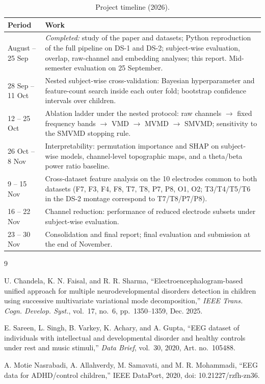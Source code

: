 \documentclass[11pt,a4paper]{article}
\begin{document}
\begin{table}[h]
\centering\footnotesize
\caption{Project timeline (2026).}
\label{tab:plan}
\begin{tabularx}{\textwidth}{l X}
\toprule
Period & Work \\
\midrule
August -- 25 Sep & \emph{Completed:} study of the paper and datasets; Python
       reproduction of the full pipeline on DS-1 and DS-2; subject-wise
       evaluation, overlap, raw-channel and embedding analyses; this report.
       Mid-semester evaluation on 25 September. \\
28 Sep -- 11 Oct & Nested subject-wise cross-validation: Bayesian
       hyperparameter and feature-count search inside each outer fold;
       bootstrap confidence intervals over children. \\
12 -- 25 Oct & Ablation ladder under the nested protocol: raw channels
       $\rightarrow$ fixed frequency bands $\rightarrow$ VMD $\rightarrow$
       MVMD $\rightarrow$ SMVMD; sensitivity to the SMVMD stopping rule. \\
26 Oct -- 8 Nov & Interpretability: permutation importance and SHAP on
       subject-wise models, channel-level topographic maps, and a theta/beta
       power ratio baseline. \\
9 -- 15 Nov & Cross-dataset feature analysis on the 10 electrodes common to
       both datasets (F7, F3, F4, F8, T7, T8, P7, P8, O1, O2; T3/T4/T5/T6 in
       the DS-2 montage correspond to T7/T8/P7/P8). \\
16 -- 22 Nov & Channel reduction: performance of reduced electrode subsets
       under subject-wise evaluation. \\
23 -- 30 Nov & Consolidation and final report; final evaluation and
       submission at the end of November. \\
\bottomrule
\end{tabularx}
\end{table}

\footnotesize
\begin{thebibliography}{9}
\setlength{\itemsep}{0pt}

 U. Chandela, K. N. Faisal, and R. R. Sharma,
``Electroencephalogram-based unified approach for multiple neurodevelopmental
disorders detection in children using successive multivariate variational mode
decomposition,'' \emph{IEEE Trans. Cogn. Develop. Syst.}, vol.~17, no.~6,
pp.~1350--1359, Dec. 2025.

 E. Sareen, L. Singh, B. Varkey, K. Achary, and
A. Gupta, ``EEG dataset of individuals with intellectual and developmental
disorder and healthy controls under rest and music stimuli,'' \emph{Data
Brief}, vol.~30, 2020, Art. no.~105488.

 A. Motie Nasrabadi, A. Allahverdy, M. Samavati, and
M. R. Mohammadi, ``EEG data for ADHD/control children,'' IEEE DataPort, 2020,
doi: 10.21227/rzfh-zn36.

\end{thebibliography}
\end{document}
